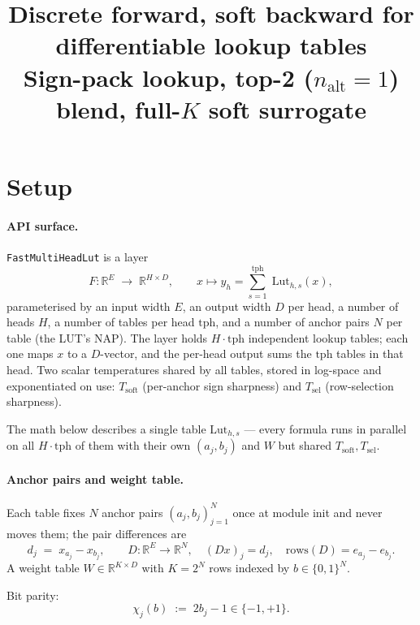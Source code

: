 \documentclass[11pt]{article}
\newcommand{\R}{\mathbb{R}}
\newcommand{\Tsel}{T_{\mathrm{sel}}}
\newcommand{\Tsoft}{T_{\mathrm{soft}}}
\newcommand{\dout}{D}
\begin{document}
\title{\Large\textbf{Discrete forward, soft backward for differentiable lookup tables}\\[2pt]
\large Sign-pack lookup, top-2 \texorpdfstring{($n_{\text{alt}}{=}1$)}{(n\_alt=1)} blend, full-$K$ soft surrogate}
\author{}
\date{}
\maketitle
\vspace{-22pt}

\section{Setup}

\paragraph{API surface.} \texttt{FastMultiHeadLut} is a layer
\[
F : \R^{E} \;\to\; \R^{H \times \dout},
\qquad x \mapsto y_h = \sum_{s=1}^{\text{tph}}\; \text{Lut}_{h,s}(x),
\]
parameterised by an input width $E$, an output width $\dout$ per head, a number of heads $H$, a number of tables per head $\text{tph}$, and a number of anchor pairs $N$ per table (the LUT's NAP). The layer holds $H \cdot \text{tph}$ independent lookup tables; each one maps $x$ to a $\dout$-vector, and the per-head output sums the $\text{tph}$ tables in that head. Two scalar temperatures shared by all tables, stored in log-space and exponentiated on use: $\Tsoft$ (per-anchor sign sharpness) and $\Tsel$ (row-selection sharpness).

The math below describes a single table $\text{Lut}_{h,s}$ — every formula runs in parallel on all $H \cdot \text{tph}$ of them with their own $(a_j, b_j)$ and $W$ but shared $\Tsoft, \Tsel$.

\paragraph{Anchor pairs and weight table.} Each table fixes $N$ anchor pairs $(a_j, b_j)_{j=1}^{N}$ once at module init and never moves them; the pair differences are
\[
d_j \;=\; x_{a_j} - x_{b_j}, \qquad D : \R^E \to \R^{N}, \quad (Dx)_j = d_j, \quad \text{rows}(D) = e_{a_j} - e_{b_j}.
\]
A weight table $W \in \R^{K \times \dout}$ with $K = 2^{N}$ rows indexed by $b \in \{0,1\}^{N}$.

Bit parity:
\[
\chi_j(b) \;:=\; 2 b_j - 1 \in \{-1, +1\}.
\]
\end{document}
